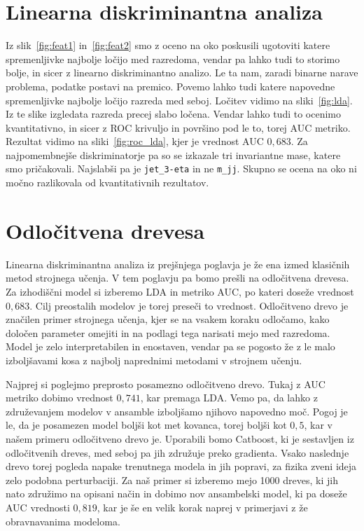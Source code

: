 \documentclass[notoc]{porocilo}
\begin{document}
\section{Linearna diskriminantna analiza}
Iz slik~\ref{fig:feat1} in~\ref{fig:feat2} smo z oceno na oko poskusili ugotoviti katere spremenljivke najbolje ločijo med razredoma, vendar pa lahko tudi to storimo bolje, in sicer z linearno diskriminantno analizo. Le ta nam, zaradi binarne narave problema, podatke postavi na premico. Povemo lahko tudi katere napovedne spremenljivke najbolje ločijo razreda med seboj. Ločitev vidimo na sliki~\ref{fig:lda}. Iz te slike izgledata razreda precej slabo ločena. Vendar lahko tudi to ocenimo kvantitativno, in sicer z ROC krivuljo in površino pod le to, torej AUC metriko. Rezultat vidimo na sliki~\ref{fig:roc_lda}, kjer je vrednost AUC $0,683$. Za najpomembnejše diskriminatorje pa so se izkazale tri invariantne mase, katere smo pričakovali. Najslabši pa je \texttt{jet\_3-eta} in ne \texttt{m\_jj}. Skupno se ocena na oko ni močno razlikovala od kvantitativnih rezultatov.


\section{Odločitvena drevesa}
Linearna diskriminantna analiza iz prejšnjega poglavja je že ena izmed klasičnih metod strojnega učenja. V tem poglavju pa bomo prešli na odločitvena drevesa. Za izhodiščni model si izberemo LDA in metriko AUC, po kateri doseže vrednost $0,683$. Cilj preostalih modelov je torej preseči to vrednost. Odločitveno drevo je značilen primer strojnega učenja, kjer se na vsakem koraku odločamo, kako določen parameter omejiti in na podlagi tega narisati mejo med razredoma. Model je zelo interpretabilen in enostaven, vendar pa se pogosto že z le malo izboljšavami kosa z najbolj naprednimi metodami v strojnem učenju.

Najprej si poglejmo preprosto posamezno odločitveno drevo. Tukaj z AUC metriko dobimo vrednost $0,741$, kar premaga LDA. Vemo pa, da lahko z združevanjem modelov v ansamble izboljšamo njihovo napovedno moč. Pogoj je le, da je posamezen model boljši kot met kovanca, torej boljši kot $0,5$, kar v našem primeru odločitveno drevo je. Uporabili bomo Catboost, ki je sestavljen iz odločitvenih dreves, med seboj pa jih združuje preko gradienta. Vsako naslednje drevo torej pogleda napake trenutnega modela in jih popravi, za fizika zveni ideja zelo podobna perturbaciji. Za naš primer si izberemo mejo 1000 dreves, ki jih nato združimo na opisani način in dobimo nov ansambelski model, ki pa doseže AUC vrednosti $0,819$, kar je še en velik korak naprej v primerjavi z že obravnavanima modeloma.
\end{document}
